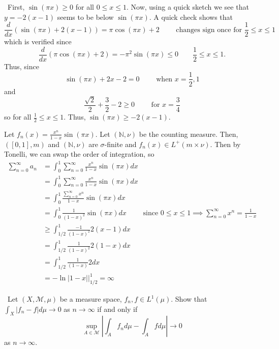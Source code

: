 \documentclass[12pt]{Homework}
\begin{document}
\begin{solution}$\,$
First, $\sin(\pi x)\ge 0$ for all $0\le x\le 1$. Now, using a quick sketch we see that $y=-2(x-1)$ seems to be below $\sin(\pi x)$. A quick check shows that $$\frac{d}{dx}(\sin(\pi x)+2(x-1))=\pi\cos(\pi x)+2\qquad\text{ changes sign once for }\frac{1}{2}\le x\le 1$$ which is verified since $$\frac{d}{dx}(\pi\cos(\pi x)+2)=-\pi^2\sin(\pi x)\le0\qquad\frac{1}{2}\le x\le 1.$$ Thus, since $$\sin(\pi x)+2x-2=0\qquad\text{ when }x=\frac{1}{2},1$$ and $$\frac{\sqrt{2}}{2}+\frac{3}{2}-2\ge 0\qquad\text{ for }x=\frac{3}{4}$$ so for all $\frac{1}{2}\le x\le 1$. Thus, $\sin(\pi x)\ge -2(x-1)$.

Let $f_n(x)=\frac{x^n}{1-x}\sin(\pi x)$.
Let $(\mathbb{N},\nu)$ be the counting measure. 
Then, $([0,1],m)$ and $(\mathbb{N},\nu)$ are $\sigma$-finite and $f_n(x)\in L^+(m\times \nu)$. Then by Tonelli, we can swap the order of integration, so \begin{align*}
    \sum_{n=0}^\infty a_n&=\int_0^1\sum_{n=0}^\infty\frac{x^n}{1-x}\sin(\pi x)dx\\
    &=\int_0^1\sum_{n=0}^\infty\frac{x^n}{1-x}\sin(\pi x)dx\\
    &=\int_0^1\frac{\sum_{n=0}^\infty x^n}{1-x}\sin(\pi x)dx\\
    &=\int_0^1\frac{1}{(1-x)^2}\sin(\pi x)dx\qquad\text{ since }0\le x\le 1\implies \sum_{n=0}^\infty x^n=\frac{1}{1-x}\\
    &\ge\int_{1/2}^1\frac{-1}{(1-x)^2}2(x-1)dx\\
    &=\int_{1/2}^1\frac{1}{(1-x)^2}2(1-x)dx\\
    &=\int_{1/2}^1\frac{1}{(1-x)}2dx\\
    &=-\ln|1-x|\bigg|_{1/2}^1=\infty
\end{align*}
\end{solution}
\newpage

\begin{problem} $\,$
Let $(X,\mathscr{M},\mu)$ be a measure space, $f_n,f\in L^1(\mu)$. Show that $\int_X|f_n-f|d\mu\to0$ as $n\to\infty$ if and only if $$\sup_{A\in\mathscr{M}}\left|\int_Af_nd\mu-\int_Afd\mu\right|\to0$$ as $n\to\infty.$
\end{problem}
\end{document}
